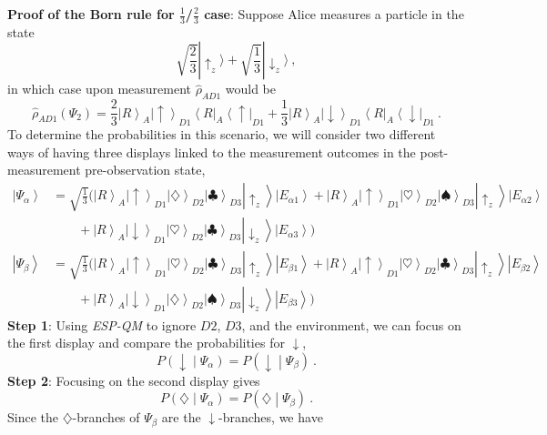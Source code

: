 \documentclass[12pt,onecolumn,secnumarabic,amsmath,amssymb,balancelastpage,nofootinbib]{article}
\newcommand{\bra}[1]{\ensuremath{\left\langle#1\right|}}
\newcommand{\ket}[1]{\ensuremath{\left|#1\right\rangle}}
\begin{document}
\textbf{Proof of the Born rule for $\frac{1}{3}$/$\frac{2}{3}$ case}:  Suppose Alice measures a particle in the state
\begin{equation}
\sqrt{\frac{2}{3}}|\uparrow_z\rangle+\sqrt{\frac{1}{3}}|\downarrow_z\rangle\ ,
\end{equation}
in which case upon measurement $\widehat{\rho}_{AD1}$ would be
\begin{equation}
\widehat{\rho}_{AD1}\left(\Psi_2\right)=\frac{2}{3}\ket{R}_A\ket{\uparrow}_{D1}\bra{R}_A\bra{\uparrow}_{D1}+\frac{1}{3}\ket{R}_A\ket{\downarrow}_{D1}\bra{R}_A\bra{\downarrow}_{D1}\ .
\label{23reduced}
\end{equation}
To determine the probabilities in this scenario, we will consider two different ways of having three displays linked to the measurement outcomes in the post-measurement pre-observation state,
\begin{align} \ket{\Psi_\alpha}&=\sqrt{\frac{1}{3}}\Big(\ket{R}_A\ket{\uparrow}_{D1}\ket{\diamondsuit}_{D2}\ket{\clubsuit}_{D3}\ket{\uparrow_z}\ket{E_{\alpha 1}}+\ket{R}_A\ket{\uparrow}_{D1}\ket{\heartsuit}_{D2}\ket{\spadesuit}_{D3}\ket{\uparrow_z}\ket{E_{\alpha 2}}
\nonumber
\\
&\qquad
+\ket{R}_A\ket{\downarrow}_{D1}\ket{\heartsuit}_{D2}\ket{\clubsuit}_{D3}\ket{\downarrow_z}\ket{E_{\alpha 3}}\Big)
\nonumber
\\
\ket{\Psi_\beta}&=\sqrt{\frac{1}{3}}\Big(\ket{R}_A\ket{\uparrow}_{D1}\ket{\heartsuit}_{D2}\ket{\clubsuit}_{D3}\ket{\uparrow_z}\ket{E_{\beta 1}}+\ket{R}_A\ket{\uparrow}_{D1}\ket{\heartsuit}_{D2}\ket{\clubsuit}_{D3}\ket{\uparrow_z}\ket{E_{\beta 2}}
\nonumber
\\
&\qquad+\ket{R}_A\ket{\downarrow}_{D1}\ket{\diamondsuit}_{D2}\ket{\spadesuit}_{D3}\ket{\downarrow_z}\ket{E_{\beta 3}}\Big)
\label{alphaandbetastates}
\end{align}
\textbf{Step 1}:  Using \emph{ESP-QM} to ignore $D2$, $D3$, and the environment, we can focus on the first display and compare the probabilities for $\downarrow$,
\begin{equation}
P\left(\downarrow\middle|\Psi_\alpha\right)=P\left(\downarrow\middle|\Psi_\beta\right)\ .
\label{ss1}
\end{equation}
\textbf{Step 2}:  Focusing on the second display gives
\begin{equation}
P\left(\diamondsuit\middle|\Psi_\alpha\right)=P\left(\diamondsuit\middle|\Psi_\beta\right)\ . 
\label{ss15}
\end{equation}
Since the $\diamondsuit$-branches of $\Psi_\beta$ are the $\downarrow$-branches, we have
\end{document}
